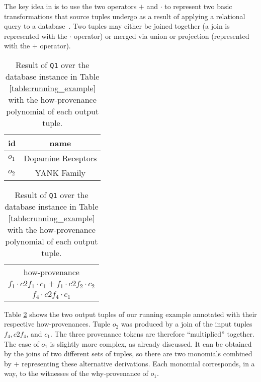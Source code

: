 The key idea in \citet{howProvenanceGreen} is to use the two operators $+$ and $\cdot$ to represent two basic transformations that source tuples undergo as a result of applying a relational query to a database~\citep{CheneyProvSurvey}. 
Two tuples may either be joined together (a join is represented with the $\cdot$ operator) or merged via union or projection (represented with the $+$ operator).

 

\begin{table}[]
\centering
  \begin{tabular}{|l||c|}
  \hline
    id & name\\
    \hline
    $o_1$ &  Dopamine Receptors\\
    $o_2$ & YANK Family\\
    \hline
  \end{tabular}
  \begin{tabular}{c}
  	how-provenance   \\
  	$f_1 \cdot c2f_1 \cdot c_1 + f_1 \cdot c2f_2 \cdot c_2$ \\
  	$f_4 \cdot c2f_4 \cdot c_1$ \\
  \end{tabular}
    \caption{Result of \texttt{Q1} over the database instance in Table \ref{table:running_example} with the  how-provenance polynomial of each output tuple.}
  \label{table:result_how_prov}
\end{table} 

Table \ref{table:result_how_prov} shows the two output tuples of our running example annotated with their respective how-provenances. 
Tuple $o_2$ was produced by a join of the input tuples $f_4, c2f_4$, and $c_1$. The three provenance tokens are therefore  ``multiplied'' together. 
The case of $o_1$ is slightly more complex, as already discussed.
It can be obtained by the joins of two different sets of tuples, so there are two monomials combined by $+$ representing these alternative derivations. Each monomial corresponds, in a way, to the witnesses of the why-provenance of $o_1$.

